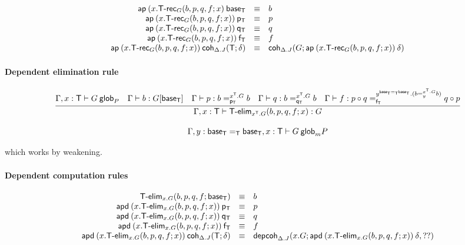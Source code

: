\begin{small}
  \[
  \begin{array}{rcl}
    \mathsf{ap} \: {(x.\mathsf{T\text{-}rec}_G(b, p, q, f; x)} \: {\mathsf{base_T}} & \equiv & b\\
    \mathsf{ap} \: {(x.\mathsf{T\text{-}rec}_G(b, p, q, f; x))} \: {\mathsf{p_T}} & \equiv & p\\
    \mathsf{ap} \: {(x.\mathsf{T\text{-}rec}_G(b, p, q, f; x))} \: {\mathsf{q_T}} & \equiv & q\\
    \mathsf{ap} \: {(x.\mathsf{T\text{-}rec}_G(b, p, q, f; x))} \: {\mathsf{f_T}} & \equiv & f\\
    \mathsf{ap} \: {(x.\mathsf{T\text{-}rec}_G(b, p, q, f; x))} \: {\mathsf{coh}_{\Delta.J} ({\mathsf{T}};{\delta})} & \equiv &
    \mathsf{coh}_{\Delta.J} ({G};{\mathsf{ap} \: {(x.\mathsf{T\text{-}rec}_G(b, p, q, f; x))} \: {\delta}})
  \end{array}
  \]
\end{small}

\paragraph{Dependent elimination rule}

\begin{small}
  \[
  \infer{\ofglob{\Gamma,x:\dsd{T}}{\dsd{T\text{-}elim}_{x^\dsd{T}.G}
      (b, p, q, f; x)}{G}}
  {\wfglob{\Gamma,x:\dsd{T}}{G}{P}
    & \ofglob{\Gamma}{b}{G[\baseT]}
    & \ofglob{\Gamma}{p}{\dhomj{x^{\dsd{T}}.G}{b}{b}{\pT}}
    & \ofglob{\Gamma}{q}{\dhomj{x^{\dsd{T}}.G}{b}{b}{\qT}}
    & \ofglob{\Gamma}{f}{\dhomj{y^{\homj{\dsd{T}}{\baseT}{\baseT}}.(\dhomj{x^{\dsd{T}}.G}{b}{b}{y})}
      {p\circ q}{q \circ p}{\fT}}}
  \]
\end{small}

\[{\Gamma,y:\mathsf{base_T} =_{\mathsf{T}} \mathsf{base_T},x:\mathsf{T}} \vdash {G} \: \mathsf{glob}_{m}{P}\]

which works by weakening.


\paragraph{Dependent computation rules}

\[
\begin{array}{rcl}
\mathsf{T\text{-}elim}_{x.G}(b, p, q, f; \mathsf{base_T}) & \equiv & b \\
\mathsf{apd} \: {(x.\mathsf{T\text{-}elim}_{x.G}(b, p, q, f; x))} \: {\mathsf{p_T}} & \equiv & p\\
\mathsf{apd} \: {(x.\mathsf{T\text{-}elim}_{x.G}(b, p, q, f; x))} \: {\mathsf{q_T}} & \equiv & q\\
\mathsf{apd} \: {(x.\mathsf{T\text{-}elim}_{x.G}(b, p, q, f; x))} \: {\mathsf{f_T}} & \equiv & f\\
\mathsf{apd} \: {(x.\mathsf{T\text{-}elim}_{x.G}(b, p, q, f; x))} \: {\mathsf{coh}_{\Delta.J} ({\mathsf{T}};{\delta})} & \equiv &
\mathsf{depcoh}_{\Delta.J} ({x.G};{\mathsf{apd} \: {(x.\mathsf{T\text{-}elim}_{x.G}(b, p, q, f; x))} \: {\delta}},{??})
\end{array}
\]

